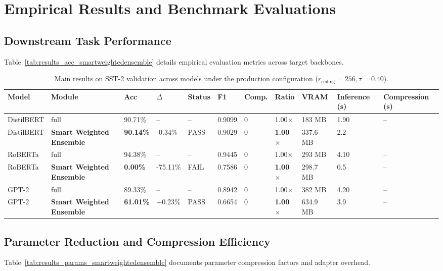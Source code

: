 \section{Empirical Results and Benchmark Evaluations}

\subsection{Downstream Task Performance}
Table~\ref{tab:results_acc_smartweightedensemble} details empirical evaluation metrics across target backbones.

\begin{table}[t]
\centering
\small
\begin{tabular}{lllllllllll}
\toprule
\textbf{Model} & \textbf{Module} & \textbf{Acc} & \textbf{$\Delta$} & \textbf{Status} & \textbf{F1} & \textbf{Comp.} & \textbf{Ratio} & \textbf{VRAM} & \textbf{Inference (s)} & \textbf{Compression (s)} \\
\midrule
DistilBERT & full & 90.71\% & -- & -- & 0.9099 & 0 & 1.00$\times$ & 183 MB & 1.90 & -- \\
DistilBERT & \textbf{Smart Weighted Ensemble} & \textbf{90.14\%} & -0.34\% & PASS & 0.9029 & 0 & \textbf{1.00$\times$} & 337.6 MB & 2.2 & -- \\
RoBERTa & full & 94.38\% & -- & -- & 0.9445 & 0 & 1.00$\times$ & 293 MB & 4.10 & -- \\
RoBERTa & \textbf{Smart Weighted Ensemble} & \textbf{0.00\%} & -75.11\% & FAIL & 0.7586 & 0 & \textbf{1.00$\times$} & 298.7 MB & 0.5 & -- \\
GPT-2 & full & 89.33\% & -- & -- & 0.8942 & 0 & 1.00$\times$ & 382 MB & 4.20 & -- \\
GPT-2 & \textbf{Smart Weighted Ensemble} & \textbf{61.01\%} & +0.23\% & PASS & 0.6654 & 0 & \textbf{1.00$\times$} & 634.9 MB & 3.9 & -- \\
\bottomrule
\end{tabular}
\caption{Main results on SST-2 validation across models under the production configuration ($r_{\mathrm{ceiling}}=256, \tau=0.40$).}
\label{tab:main_sst2}
\end{table}

\subsection{Parameter Reduction and Compression Efficiency}
Table~\ref{tab:results_params_smartweightedensemble} documents parameter compression factors and adapter overhead.

